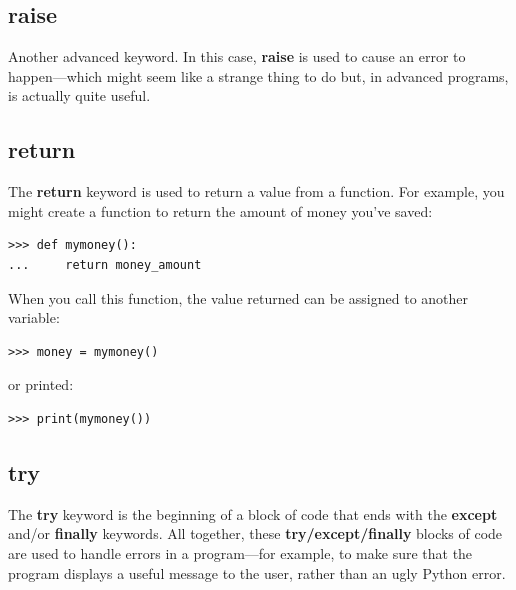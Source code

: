 \subsection*{raise}

Another advanced keyword.  In this case, \textbf{raise} is used to cause an error to happen---which might seem like a strange thing to do but, in advanced programs, is actually quite useful.

\subsection*{return}

The \textbf{return} keyword is used to return a value from a function.  For example, you might create a function to return the amount of money you've saved:

\begin{listingignore}
\begin{verbatim}
>>> def mymoney():
...     return money_amount
\end{verbatim}
\end{listingignore}

\noindent
When you call this function, the value returned can be assigned to another variable:

\begin{listingignore}
\begin{verbatim}
>>> money = mymoney()
\end{verbatim}
\end{listingignore}

\noindent
or printed:

\begin{listingignore}
\begin{verbatim}
>>> print(mymoney())
\end{verbatim}
\end{listingignore}

\subsection*{try}

The \textbf{try} keyword is the beginning of a block of code that ends with the \textbf{except} and/or \textbf{finally} keywords.  All together, these \textbf{try/except/finally} blocks of code are used to handle errors in a program---for example, to make sure that the program displays a useful message to the user, rather than an ugly Python error.

